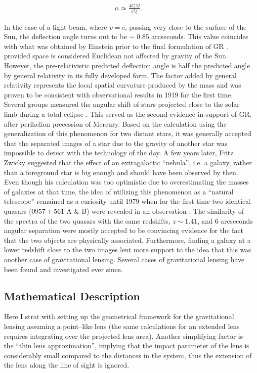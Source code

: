 \documentclass[paper=a4, fontsize=11pt]{scrartcl} %
\numberwithin{equation}{section} %
\numberwithin{figure}{section} %
\numberwithin{table}{section} %
\begin{document}
\begin{eqnarray}
\label{eq:alpha}
\alpha \simeq \frac{4GM}{v^2 \xi}.
\end{eqnarray}

In the case of a light beam, where $v = c$, passing very close to the surface of the Sun, the deflection angle turns out to be $\sim$ 0.85 arcseconds. This value coincides with what was obtained by Einstein prior to the final formulation of GR \citep[][]{Einstein1911}, provided space is considered Euclidean not affected by gravity of the Sun. However, the pre-relativistic predicted deflection angle is half the predicted angle by general relativity in its fully developed form. The factor added by general relativity represents the local spatial curvature produced by the mass and was proven to be consistent with observational results in 1919 for the first time. Several groups measured the angular shift of stars projected close to the solar limb during a total eclipse \citet{Eddington+1919}. This served as the second evidence in support of GR, after perihelion precession of Mercury. Based on the calculation using the generalization of this phenomenon for two distant stars, it was generally accepted that the separated images of a star due to the gravity of another star was impossible to detect with the technology of the day. A few years later, Fritz Zwicky suggested  \citep{Zwicky1937} that the effect of an extragalactic ``nebula'', i.e. a galaxy, rather than a foreground star is big enough and should have been observed by then. Even though his calculation was too optimistic due to overestimating the masses of galaxies at that time, the idea of utilizing this phenomenon as a ``natural telescope''  remained as a curiosity until 1979 when for the first time two identical quasars ($0957+561$ A \& B) were revealed in an observation \citep{Walsh+1979}. The similarity of the spectra of the two quasars with the same redshifts, $z \sim 1.41$, and 6 arcseconds angular separation were mostly accepted to be convincing evidence for the fact that the two objects are physically associated. Furthermore, finding a galaxy at a lower redshift close to the two images lent more support to the idea that this was another case of gravitational lensing. Several cases of gravitational lensing have been found and investigated ever since.

\subsection{Mathematical Description}
Here I strat with setting up the geometrical framework for the gravitational lensing assuming a point--like lens (the same calculations for an extended lens requires integrating over the projected lens area). Another simplifying factor is the ``thin lens approximation'', implying that the impact parameter of the lens is considerably small compared to the distances in the system, thus the extension of the lens along the line of sight is ignored.
\end{document}
